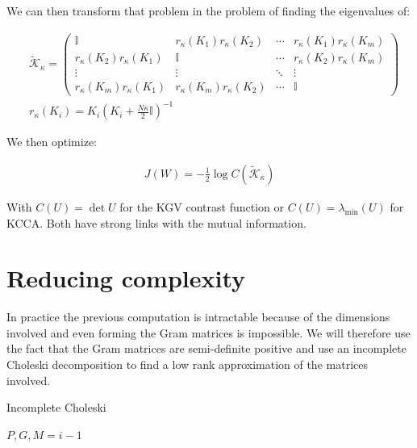 \documentclass[a4paper,BCOR=5mm,oneside,openany]{scrreprt}
\DeclareMathOperator*{\argmax}{arg\,max}
\begin{document}
We can then transform that problem in the problem of finding the eigenvalues of:
						
\begin{align*}
	&\tilde{\mathcal{K}}_\kappa = \begin{pmatrix}
		\mathbb{I} & r_\kappa (K_1)  r_\kappa (K_2)  & \cdots &  r_\kappa (K_1) r_\kappa (K_m)\\
		r_\kappa (K_2)  r_\kappa (K_1) & \mathbb{I} & \cdots & r_\kappa (K_2) r_\kappa (K_m) \\
		\vdots & \vdots & \ddots & \vdots \\
		r_\kappa (K_m)  r_\kappa (K_1) & r_\kappa (K_m) r_\kappa (K_2) & \cdots & \mathbb{I}
	\end{pmatrix} \\
	& r_\kappa (K_i) = K_i (K_i + \frac{N \kappa}{2} \mathbb{I})^{-1}
\end{align*}

We then optimize:

\begin{align*}
	J(W) = -\frac{1}{2} \log C \left( \tilde{\mathcal{K}}_\kappa \right)
\end{align*}

With $C(U) = \det U$ for the KGV contrast function or $C(U) = \lambda_\text{min} (U)$ for KCCA. Both have strong links with the mutual information.

\section{Reducing complexity}

In practice the previous computation is intractable because of the dimensions involved and even forming the Gram matrices is impossible. We will therefore use the fact that the Gram matrices are semi-definite positive and use an incomplete Choleski decomposition to find a low rank approximation of the matrices involved.

\begin{algorithm}
\caption{Incomplete Choleski} \label{chol}
\begin{algorithmic}
    
    
		\State{$j \gets \argmax_{j \in [1,n]} G_{jj}$}
		\EndFor
    \EndWhile
    \State \Return $P, G, M = i-1$
    \EndProcedure
\end{algorithmic}    
\end{algorithm}
\end{document}
